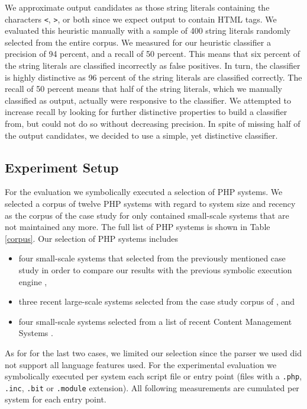 \documentclass[sigconf]{acmart}
\begin{document}
We approximate output candidates as those string literals containing the
characters \texttt{<}, \texttt{>}, or both since we expect output to contain
HTML tags. We evaluated this heuristic manually with a sample of 400 string
literals randomly selected from the entire corpus.
We measured for our heuristic classifier a precision of 94 percent, and a
recall of 50 percent. This means that six percent of the string literals are
classified incorrectly as false positives. In turn, the classifier is highly
distinctive as 96 percent of the string literals are classified correctly. The
recall of 50 percent means that half of the string literals, which we manually 
classified as output, actually were responsive to the classifier. We attempted
to increase recall by looking for further distinctive properties to build a
classifier from, but could not do so without decreasing precision. In spite of
missing half of the output candidates, we decided to use a simple, yet
distinctive classifier.

\subsection{Experiment Setup} \label{sec:experiment_setup}
For the evaluation we symbolically executed a selection of PHP systems. We
selected a corpus of twelve PHP systems with regard to system size and recency
as the corpus of the case study for \cite{Nguyen:2014:BCG:2635868.2635928} only
contained small-scale systems that are not maintained any more. The full list
of PHP systems is shown in Table \ref{corpus}. Our selection of PHP systems
includes%
\begin{itemize}
	\item four small-scale systems that selected from the previously mentioned case
	study in order to compare our results with the previous symbolic execution
	engine \cite{Nguyen:2014:BCG:2635868.2635928},

	\item three recent large-scale systems selected from the case study corpus of
	\cite{Hills:2013:ESP:2483760.2483786}, and
	
	\item four small-scale systems selected from a list of recent Content
	Management Systems \cite{codegeekz}.
\end{itemize}

As for for the last two cases, we limited our selection since the parser we
used did not support all language features used. For the experimental evaluation we symbolically executed per system each script file or entry point (files with a \texttt{.php}, \texttt{.inc}, \texttt{.bit} or \texttt{.module} extension). All following measurements are cumulated per system for each entry point. 
\end{document}
